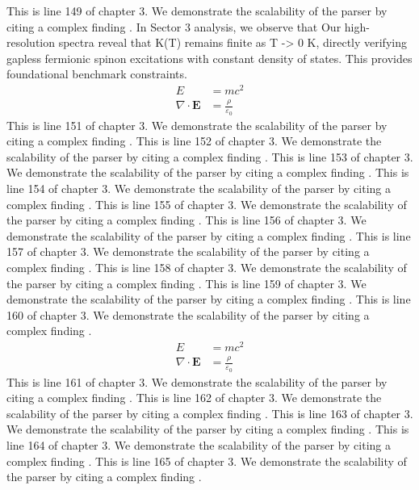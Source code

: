 This is line 149 of chapter 3. We demonstrate the scalability of the parser by citing a complex finding \cite{ref3_149}.
In Sector 3 analysis, we observe that Our high-resolution spectra reveal that K(T) remains finite as T -> 0 K, directly verifying gapless fermionic spinon excitations with constant density of states. This provides foundational benchmark constraints.
\begin{align*}
  E &= mc^2 \\
  \nabla \cdot \mathbf{E} &= \frac{\rho}{\varepsilon_0}
\end{align*}
This is line 151 of chapter 3. We demonstrate the scalability of the parser by citing a complex finding \cite{ref3_151}.
This is line 152 of chapter 3. We demonstrate the scalability of the parser by citing a complex finding \cite{ref3_152}.
This is line 153 of chapter 3. We demonstrate the scalability of the parser by citing a complex finding \cite{ref3_153}.
This is line 154 of chapter 3. We demonstrate the scalability of the parser by citing a complex finding \cite{ref3_154}.
This is line 155 of chapter 3. We demonstrate the scalability of the parser by citing a complex finding \cite{ref3_155}.
This is line 156 of chapter 3. We demonstrate the scalability of the parser by citing a complex finding \cite{ref3_156}.
This is line 157 of chapter 3. We demonstrate the scalability of the parser by citing a complex finding \cite{ref3_157}.
This is line 158 of chapter 3. We demonstrate the scalability of the parser by citing a complex finding \cite{ref3_158}.
This is line 159 of chapter 3. We demonstrate the scalability of the parser by citing a complex finding \cite{ref3_159}.
This is line 160 of chapter 3. We demonstrate the scalability of the parser by citing a complex finding \cite{ref3_160}.
\begin{align*}
  E &= mc^2 \\
  \nabla \cdot \mathbf{E} &= \frac{\rho}{\varepsilon_0}
\end{align*}
This is line 161 of chapter 3. We demonstrate the scalability of the parser by citing a complex finding \cite{ref3_161}.
This is line 162 of chapter 3. We demonstrate the scalability of the parser by citing a complex finding \cite{ref3_162}.
This is line 163 of chapter 3. We demonstrate the scalability of the parser by citing a complex finding \cite{ref3_163}.
This is line 164 of chapter 3. We demonstrate the scalability of the parser by citing a complex finding \cite{ref3_164}.
This is line 165 of chapter 3. We demonstrate the scalability of the parser by citing a complex finding \cite{ref3_165}.
